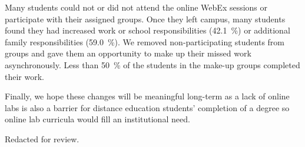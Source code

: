 \documentclass[aip, numerical, preprint]{revtex4-2}
\begin{document}
Many students could not or did not attend the online WebEx sessions or participate with their
assigned groups.  Once they left campus, many students found they had increased work or school
responsibilities (\SI{42.1}{\percent}) or additional family responsibilities
(\SI{59.0}{\percent}).\citep{ECUcovidSurveyRedacted} We removed non-participating students from
groups and gave them an opportunity to make up their missed work asynchronously. Less than
\SI{50}{\percent} of the students in the make-up groups completed their work.

Finally, we hope these changes will be meaningful long-term as a lack of online labs is also a
barrier for distance education students' completion of a degree so online lab curricula would
fill an institutional need.


\begin{acknowledgments}
  Redacted for review.%
\end{acknowledgments}


\end{document}
